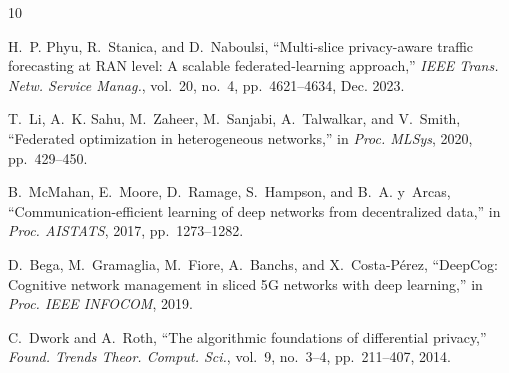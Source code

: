\documentclass[11pt,a4paper]{article}
\begin{document}
\begin{thebibliography}{10}

H.~P. Phyu, R.~Stanica, and D.~Naboulsi, ``Multi-slice privacy-aware traffic forecasting at {RAN} level: A scalable federated-learning approach,'' \emph{IEEE Trans. Netw. Service Manag.}, vol.~20, no.~4, pp.~4621--4634, Dec. 2023.

T.~Li, A.~K. Sahu, M.~Zaheer, M.~Sanjabi, A.~Talwalkar, and V.~Smith, ``Federated optimization in heterogeneous networks,'' in \emph{Proc. MLSys}, 2020, pp.~429--450.

B.~McMahan, E.~Moore, D.~Ramage, S.~Hampson, and B.~A. y~Arcas, ``Communication-efficient learning of deep networks from decentralized data,'' in \emph{Proc. AISTATS}, 2017, pp.~1273--1282.

D.~Bega, M.~Gramaglia, M.~Fiore, A.~Banchs, and X.~Costa-P{\'e}rez, ``{DeepCog}: Cognitive network management in sliced 5{G} networks with deep learning,'' in \emph{Proc. IEEE INFOCOM}, 2019.

C.~Dwork and A.~Roth, ``The algorithmic foundations of differential privacy,'' \emph{Found. Trends Theor. Comput. Sci.}, vol.~9, no.~3--4, pp.~211--407, 2014.

\end{thebibliography}
\end{document}
